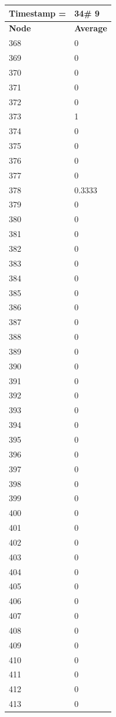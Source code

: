 \begin{tabular}{|l||l|}
\hline
\textbf{Timestamp =} & \textbf{34}\# 9\\\hline
	\textbf{Node} & \textbf{Average} \\ \hline
\hline
	368 & 0 \\ \hline
	369 & 0 \\ \hline
	370 & 0 \\ \hline
	371 & 0 \\ \hline
	372 & 0 \\ \hline
	373 & 1 \\ \hline
	374 & 0 \\ \hline
	375 & 0 \\ \hline
	376 & 0 \\ \hline
	377 & 0 \\ \hline
	378 & 0.3333 \\ \hline
	379 & 0 \\ \hline
	380 & 0 \\ \hline
	381 & 0 \\ \hline
	382 & 0 \\ \hline
	383 & 0 \\ \hline
	384 & 0 \\ \hline
	385 & 0 \\ \hline
	386 & 0 \\ \hline
	387 & 0 \\ \hline
	388 & 0 \\ \hline
	389 & 0 \\ \hline
	390 & 0 \\ \hline
	391 & 0 \\ \hline
	392 & 0 \\ \hline
	393 & 0 \\ \hline
	394 & 0 \\ \hline
	395 & 0 \\ \hline
	396 & 0 \\ \hline
	397 & 0 \\ \hline
	398 & 0 \\ \hline
	399 & 0 \\ \hline
	400 & 0 \\ \hline
	401 & 0 \\ \hline
	402 & 0 \\ \hline
	403 & 0 \\ \hline
	404 & 0 \\ \hline
	405 & 0 \\ \hline
	406 & 0 \\ \hline
	407 & 0 \\ \hline
	408 & 0 \\ \hline
	409 & 0 \\ \hline
	410 & 0 \\ \hline
	411 & 0 \\ \hline
	412 & 0 \\ \hline
	413 & 0 \\ \hline
\end{tabular}

